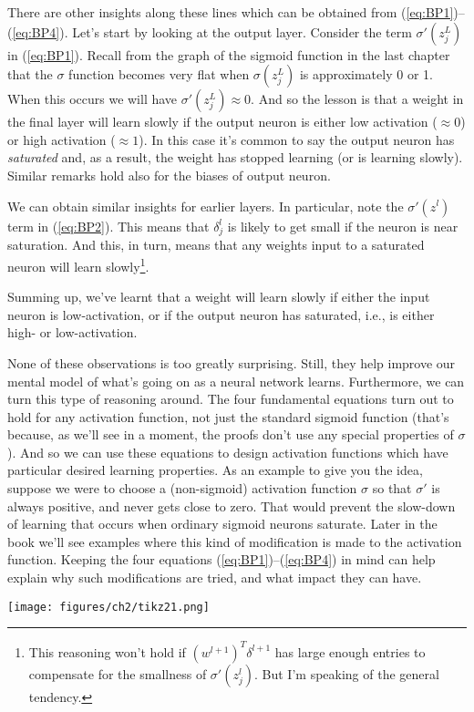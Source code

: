 \documentclass[a4paper,twoside,10pt]{book}
\begin{document}
There are other insights along these lines which can be obtained from (\ref{eq:BP1})--(\ref{eq:BP4}). Let's start by looking at the output layer. Consider the term $\sigma'(z^L_j)$ in (\ref{eq:BP1}). Recall from the graph of the sigmoid function in the last chapter that the $\sigma$ function becomes very flat when $\sigma(z^L_j)$ is approximately 0 or 1. When this occurs we will have $\sigma'(z^L_j)\approx0$. And so the lesson is that a weight in the final layer will learn slowly if the output neuron is either low activation ($\approx0$) or high activation ($\approx1$). In this case it's common to say the output neuron has \textit{saturated} and, as a result, the weight has stopped learning (or is learning slowly). Similar remarks hold also for the biases of output neuron.

We can obtain similar insights for earlier layers. In particular, note the $\sigma'(z^l)$ term in (\ref{eq:BP2}). This means that $\delta^l_j$ is likely to get small if the neuron is near saturation. And this, in turn, means that any weights input to a saturated neuron will learn slowly\footnote{This reasoning won't hold if $(w^{l+1})^T\delta^{l+1}$ has large enough entries to compensate for the smallness of $\sigma'(z^l_j)$. But I'm speaking of the general tendency.}.

Summing up, we've learnt that a weight will learn slowly if either the input neuron is low-activation, or if the output neuron has saturated, i.e., is either high- or low-activation.

None of these observations is too greatly surprising. Still, they help improve our mental model of what's going on as a neural network learns. Furthermore, we can turn this type of reasoning around. The four fundamental equations turn out to hold for any activation function, not just the standard sigmoid function (that's because, as we'll see in a moment, the proofs don't use any special properties of $\sigma$). And so we can use these equations to design activation functions which have particular desired learning properties. As an example to give you the idea, suppose we were to choose a (non-sigmoid) activation function $\sigma$ so that $\sigma'$ is always positive, and never gets close to zero. That would prevent the slow-down of learning that occurs when ordinary sigmoid neurons saturate. Later in the book we'll see examples where this kind of modification is made to the activation function. Keeping the four equations (\ref{eq:BP1})--(\ref{eq:BP4}) in mind can help explain why such modifications are tried, and what impact they can have.
\begin{center}
	\texttt{[image: figures/ch2/tikz21.png]}
\end{center}
\end{document}
